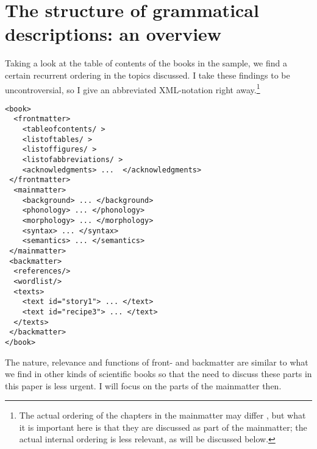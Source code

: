 

\section{The structure of grammatical descriptions: an overview}
Taking a look at the table of contents of the books in the sample, we find a certain recurrent ordering in the topics discussed. I take these findings to be uncontroversial, so I give an abbreviated XML-notation right away.\footnote{The 
 actual ordering of the chapters in the mainmatter may differ \citep{Mosel2006craft}, but what it is important here is that they are discussed as part of the mainmatter; the actual internal ordering is less relevant, as will be discussed below.
}

\ea\label{xml:book:intro}
\begin{verbatim}
<book>
  <frontmatter>
    <tableofcontents/ >
    <listoftables/ >
    <listoffigures/ >
    <listofabbreviations/ >
    <acknowledgments> ...  </acknowledgments>
 </frontmatter>
  <mainmatter>
    <background> ... </background>
    <phonology> ... </phonology>
    <morphology> ... </morphology>
    <syntax> ... </syntax>
    <semantics> ... </semantics>
 </mainmatter>
 <backmatter>
  <references/>
  <wordlist/>
  <texts>
    <text id="story1"> ... </text>
    <text id="recipe3"> ... </text>
  </texts>
 </backmatter>
</book>
\end{verbatim}
\z

The nature, relevance and functions of front- and backmatter are similar to what we find in other kinds of scientific books \citep{Mosel2006craft} so that the need to discuss these parts in this paper is less urgent. I will focus on the parts of the mainmatter then.


